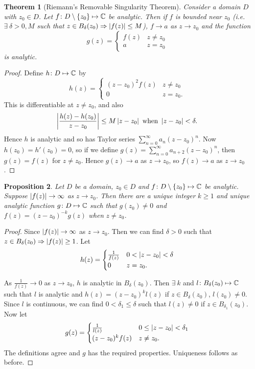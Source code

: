 \documentclass{notes}
\theoremstyle{plain}
\newtheorem{proposition}{Proposition}[chapter]
\newtheorem{theorem}[proposition]{Theorem}
\begin{document}
\begin{theorem}[Riemann's Removable Singularity Theorem]%
   Consider a domain $D$ with $z_0
  \in D$.  Let $f \colon D \setminus \{ z_0 \} \mapsto \mathbb{C}$ be
  analytic. Then if $f$ is bounded near $z_0$ (i.e.  $\exists\ \delta
  > 0, M$ such that $z \in B_\delta(z_0) \Rightarrow \left|f(z)\right| \le
  M$), $f \rightarrow a$ as $z \rightarrow z_0$ and the function
\[
g(z) = \begin{cases}
f(z) & z \neq z_0 \\
a & z = z_0
\end{cases}
\]
is analytic.
\end{theorem}

\begin{proof}
Define $h \colon D \mapsto \mathbb{C}$ by
\[
h(z) = \begin{cases}
(z-z_0)^2 f(z) & z \neq z_0 \\
0 & z = z_0.
\end{cases}
\]
This is differentiable at $z \neq z_0$, and also
\[
\left|\frac{h(z) - h(z_0)}{z-z_0}\right| \le M \left|z-z_0\right| \text{ when }
\left|z-z_0\right| < \delta.
\]
Hence $h$ is analytic and so has Taylor series $\sum_{n=0}^\infty a_n
(z-z_0)^n$.  Now $h(z_0) = h'(z_0) = 0$, so if we define
$g(z) = \sum_{n=0}^\infty a_{n+2} (z-z_0)^n$, then $g(z) = f(z)$ for
$z \neq z_0$.  Hence $g(z) \rightarrow a$ as $z \rightarrow z_0$, so
$f(z) \rightarrow a$ as $z \rightarrow z_0$.
\end{proof}

\begin{proposition}
Let $D$ be a domain, $z_0 \in D$ and $f \colon D \setminus \{ z_0 \} \mapsto \mathbb{C}$
be analytic.  Suppose $\left|f(z)\right| \rightarrow \infty$ as $z \rightarrow z_0$.
Then there are a unique integer $k \ge 1$ and unique analytic function
$g \colon D \mapsto \mathbb{C}$ such that $g(z_0) \neq 0$ and $f(z) = (z-z_0)^{-k} g(z)$
when $z \neq z_0$.
\end{proposition}

\begin{proof}
Since $\left|f(z)\right| \rightarrow \infty$ as $z \rightarrow z_0$.  Then we can
find $\delta > 0$ such that $z \in B_\delta(z_0) \Rightarrow \left|f(z)\right| \ge 1$.
Let
\[
h(z) = \begin{cases}
\frac{1}{f(z)} & 0 < \left|z-z_0\right| < \delta \\
0 & z = z_0.
\end{cases}
\]

As $\frac{1}{f(z)} \rightarrow 0$ as $z \rightarrow z_0$, $h$ is analytic
in $B_\delta(z_0)$.  Then $\exists\ k$ and $l \colon B_\delta(z_0) \mapsto \mathbb{C}$
such that $l$ is analytic and $h(z) = (z-z_0)^k l(z)$ if $z \in B_\delta(z_0)$,
$l(z_0) \neq 0$.  Since $l$ is continuous, we can find $0 < \delta_1 \le 
\delta$ such that $l(z) \neq 0$ if $z \in B_{\delta_1}(z_0)$.  Now let
\[
g(z) = \begin{cases}
\frac{1}{l(z)} & 0 \le \left|z - z_0\right| < \delta_1 \\
(z-z_0)^k f(z) & z \neq z_0.
\end{cases}
\]
The definitions agree and $g$ has the required properties.  Uniqueness follows
as before.
\end{proof}
\end{document}

